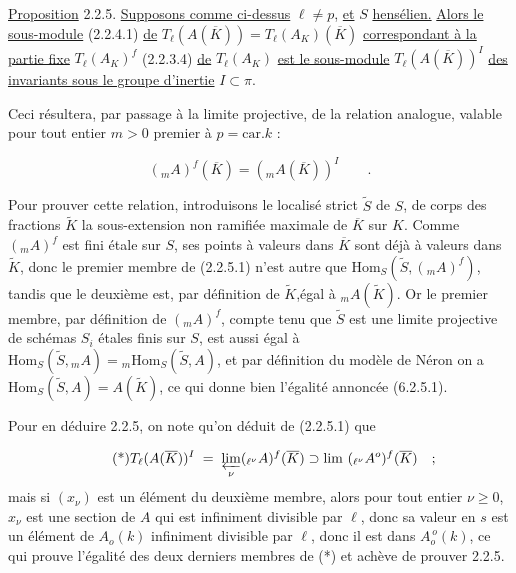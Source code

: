 \underline{Proposition} 2.2.5. \underline{Supposons comme ci-dessus} $\ell \neq p$, \underline{et} $S$ \underline{hensélien.} \underline{Alors le sous-module} (2.2.4.1) \underline{de} $T_{\ell}(A(\overline{K})) = T_{\ell}(A_{K})(\overline{K})$ \underline{correspondant à la partie fixe} $T_{\ell}(A_{K})^{f}$ (2.2.3.4) \underline{de} $T_{\ell}(A_{K})$ \underline{est le sous-module} $T_{\ell}(A(\overline{K}))^{I}$ \underline{des invariants sous le groupe d'inertie} $I \subset \pi$.

Ceci résultera, par passage à la limite projective, de la relation analogue, valable pour tout entier $m > 0$ premier à $p = \mathrm{car}.k$ :

\begin{equation}\tag{2.2.5.1}
({}_{m}A)^{f}(\overline{K}) = ({}_{m}A(\overline{K}))^{I} \qquad .
\end{equation}



Pour prouver cette relation, introduisons le localisé strict $\tilde{S}$ de $S$, de corps des fractions $\tilde{K}$ la sous-extension non ramifiée maximale de $\overline{K}$ sur $K$. Comme $({}_{m}A)^{f}$ est fini étale sur $S$, ses points à valeurs dans $\overline{K}$ sont déjà à valeurs dans $\tilde{K}$, donc le premier membre de (2.2.5.1) n'est autre que $\mathrm{Hom}_{S}(\tilde{S} , ({}_{m}A)^{f})$, tandis que le deuxième est, par définition de $\tilde{K}$,égal à ${}_{m}A(\tilde{K})$. Or le premier membre, par définition de $({}_{m}A)^{f}$, compte tenu que $\tilde{S}$ est une limite projective de schémas $S_{i}$ étales finis sur $S$, est aussi égal à $\mathrm{Hom}_{S}(\tilde{S} , {}_{m}A) = {}_{m}\mathrm{Hom}_{S}(\tilde{S},A)$, et par définition du modèle de Néron on a $\mathrm{Hom}_{S}(\tilde{S},A) = A(\tilde{K})$, ce qui donne bien l'égalité annoncée (6.2.5.1).

Pour en déduire 2.2.5, on note qu'on déduit de (2.2.5.1) que

\begin{equation}\tag{*}
T_{\ell}(A(\overline{K}))^{I} \;=\; \varprojlim_{\nu} ({}_{\ell^{\nu}}A)^{f}(\overline{K}) \supset \lim\ ({}_{\ell^{\nu}}A^{o})^{f}(\overline{K}) \quad ;
\end{equation}
mais si $(x_{\nu})$ est un élément du deuxième membre, alors pour tout entier $\nu \geq 0$, $x_{\nu}$ est une section de $A$ qui est infiniment divisible par $\ell$, donc sa valeur en $s$ est un élément de $A_{o}(k)$ infiniment divisible par $\ell$, donc il est dans $A_{o}^{\,o}(k)$, ce qui prouve l'égalité des deux derniers membres de (*) et achève de prouver 2.2.5.

